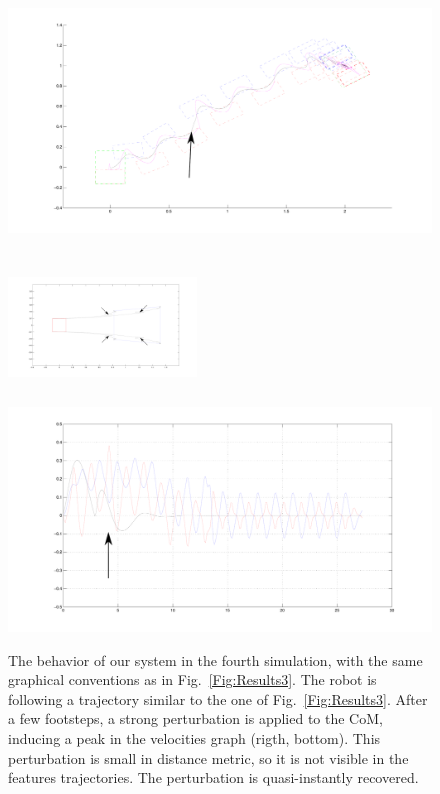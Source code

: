 \begin{figure}[h]
\begin{minipage}{0.5\textwidth}
 \centering
 \includegraphics[scale=.3]{Chap4-Visual-Servoing/steps4_hrp2_1.pdf}
\end{minipage}
\begin{minipage}{0.5\textwidth}
 \centering
 \includegraphics[width=5cm,height=4cm]{Chap4-Visual-Servoing/features4_hrp2_1.pdf}
\\
 \includegraphics[scale=.2]{Chap4-Visual-Servoing/vels4_hrp2_1.pdf}
\end{minipage}
 \caption[]{\label{Fig:Results4}\small{The behavior of our system in the fourth simulation, with the same graphical conventions as in Fig.~\ref{Fig:Results3}. The robot is following a trajectory similar to the one of Fig.~\ref{Fig:Results3}. After a few footsteps, a strong perturbation is applied to the CoM, inducing a peak in the velocities graph (rigth, bottom). This perturbation is small in distance metric, so it is not visible in the features trajectories. The perturbation is quasi-instantly recovered.}}
 \end{figure}


